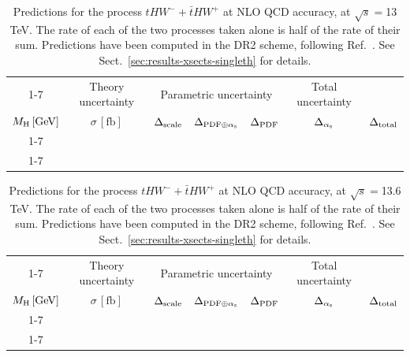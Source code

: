 \begin{table}[ht!]
\caption{\label{tab:thw-tot13} Predictions for the process $tHW^- + \bar t HW^+$ at NLO QCD accuracy, at $\sqrt{s}=$13 TeV. The rate of each of the two processes taken alone is
    half of the rate of their sum. Predictions have been computed in the DR2 scheme, following Ref.~\cite{Demartin:2016axk}. See Sect.~\ref{sec:results-xsects-singleth} for details.}
\centering
\scriptsize
{\renewcommand{\arraystretch}{1.4}
\begin{tabular}{| cc | c | ccc | c |}
\cline{1-7}
\multicolumn{2}{|c|}{\(\sqrt{s} = 13\,\mathrm{TeV}\)} &
\multicolumn{1}{|c|}{Theory uncertainty} &
\multicolumn{3}{|c|}{Parametric uncertainty} &
\multicolumn{1}{c|}{Total uncertainty} \\
\(M_\mathrm{H}\,[\mathrm{GeV}]\) & \(\sigma\,[\mathrm{fb}]\) &
\(\Delta_{\rm scale}\) &
\(\Delta_{{\rm PDF}\oplus\alpha_{\mathrm{s}}}\) &
{\color{black!55}\(\Delta_{\rm PDF}\)} & {\color{black!55}\(\Delta_{\alpha_{\mathrm{s}}}\)} &
\(\Delta_{\rm total}\)
\\
\cline{1-7}
 \\
\cline{1-7}
\end{tabular}
}
\end{table}

\begin{table}[ht!]
\caption{\label{tab:thw-tot136} Predictions for the process $tHW^- + \bar t HW^+$ at NLO QCD accuracy, at $\sqrt{s}=$13.6 TeV. The rate of each of the two processes taken alone is
    half of the rate of their sum. Predictions have been computed in the DR2 scheme, following Ref.~\cite{Demartin:2016axk}. See Sect.~\ref{sec:results-xsects-singleth} for details.}
\centering
\scriptsize
{\renewcommand{\arraystretch}{1.4}
\begin{tabular}{| cc | c | ccc | c |}
\cline{1-7}
\multicolumn{2}{|c|}{\(\sqrt{s} = 13.6\,\mathrm{TeV}\)} &
\multicolumn{1}{|c|}{Theory uncertainty} &
\multicolumn{3}{|c|}{Parametric uncertainty} &
\multicolumn{1}{c|}{Total uncertainty} \\
\(M_\mathrm{H}\,[\mathrm{GeV}]\) & \(\sigma\,[\mathrm{fb}]\) &
\(\Delta_{\rm scale}\) &
\(\Delta_{{\rm PDF}\oplus\alpha_{\mathrm{s}}}\) &
{\color{black!55}\(\Delta_{\rm PDF}\)} & {\color{black!55}\(\Delta_{\alpha_{\mathrm{s}}}\)} &
\(\Delta_{\rm total}\)
\\
\cline{1-7}
 \\
\cline{1-7}
\end{tabular}
}
\end{table}

